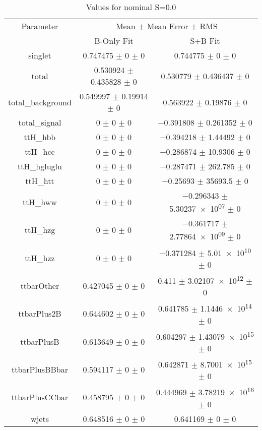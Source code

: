 \begin{table}
\centering
\caption{Values for nominal S=0.0}
\begin{tabular}{ccc}
\toprule
Parameter & \multicolumn{2}{c}{Mean $\pm$ Mean Error $\pm$ RMS}\\
 & B-Only Fit & S+B Fit\\
\midrule
singlet & \num{0.747475} $\pm$ \num{0} $\pm$ \num{0} & \num{0.744775} $\pm$ \num{0} $\pm$ \num{0}\\
total & \num{0.530924} $\pm$ \num{0.435828} $\pm$ \num{0} & \num{0.530779} $\pm$ \num{0.436437} $\pm$ \num{0}\\
total\_background & \num{0.549997} $\pm$ \num{0.19914} $\pm$ \num{0} & \num{0.563922} $\pm$ \num{0.19876} $\pm$ \num{0}\\
total\_signal & \num{0} $\pm$ \num{0} $\pm$ \num{0} & \num{-0.391808} $\pm$ \num{0.261352} $\pm$ \num{0}\\
ttH\_hbb & \num{0} $\pm$ \num{0} $\pm$ \num{0} & \num{-0.394218} $\pm$ \num{1.44492} $\pm$ \num{0}\\
ttH\_hcc & \num{0} $\pm$ \num{0} $\pm$ \num{0} & \num{-0.286874} $\pm$ \num{10.9306} $\pm$ \num{0}\\
ttH\_hgluglu & \num{0} $\pm$ \num{0} $\pm$ \num{0} & \num{-0.287471} $\pm$ \num{262.785} $\pm$ \num{0}\\
ttH\_htt & \num{0} $\pm$ \num{0} $\pm$ \num{0} & \num{-0.25693} $\pm$ \num{35693.5} $\pm$ \num{0}\\
ttH\_hww & \num{0} $\pm$ \num{0} $\pm$ \num{0} & \num{-0.296343} $\pm$ \num{5.30237e+07} $\pm$ \num{0}\\
ttH\_hzg & \num{0} $\pm$ \num{0} $\pm$ \num{0} & \num{-0.361717} $\pm$ \num{2.77864e+09} $\pm$ \num{0}\\
ttH\_hzz & \num{0} $\pm$ \num{0} $\pm$ \num{0} & \num{-0.371284} $\pm$ \num{5.01e+10} $\pm$ \num{0}\\
ttbarOther & \num{0.427045} $\pm$ \num{0} $\pm$ \num{0} & \num{0.411} $\pm$ \num{3.02107e+12} $\pm$ \num{0}\\
ttbarPlus2B & \num{0.644602} $\pm$ \num{0} $\pm$ \num{0} & \num{0.641785} $\pm$ \num{1.1446e+14} $\pm$ \num{0}\\
ttbarPlusB & \num{0.613649} $\pm$ \num{0} $\pm$ \num{0} & \num{0.604297} $\pm$ \num{1.43079e+15} $\pm$ \num{0}\\
ttbarPlusBBbar & \num{0.594117} $\pm$ \num{0} $\pm$ \num{0} & \num{0.642871} $\pm$ \num{8.7001e+15} $\pm$ \num{0}\\
ttbarPlusCCbar & \num{0.458795} $\pm$ \num{0} $\pm$ \num{0} & \num{0.444969} $\pm$ \num{3.78219e+16} $\pm$ \num{0}\\
wjets & \num{0.648516} $\pm$ \num{0} $\pm$ \num{0} & \num{0.641169} $\pm$ \num{0} $\pm$ \num{0}\\
\bottomrule
\end{tabular}
\end{table}